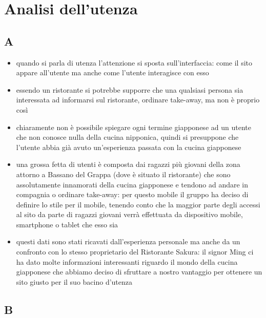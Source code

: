\documentclass[../relazione.tex]{subfiles}
\begin{document}
\section{Analisi dell'utenza}
	\subsection{A}
	\begin{itemize}
		\item quando si parla di utenza l'attenzione si sposta sull'interfaccia: come il sito appare all'utente ma anche come l'utente interagisce con esso
		\item essendo un ristorante si potrebbe supporre che una qualsiasi persona sia interessata ad informarsi sul ristorante, ordinare take-away, ma non è proprio così
		\item chiaramente non è possibile spiegare ogni termine giapponese ad un utente che non conosce nulla della cucina nipponica, quindi si presuppone che l'utente abbia già avuto un'esperienza passata con la cucina giapponese
		\item una grossa fetta di utenti è composta dai ragazzi più giovani della zona attorno a Bassano del Grappa (dove è situato il ristorante) che sono assolutamente innamorati della cucina giapponese e tendono ad andare in compagnia o ordinare take-away: per questo mobile il gruppo ha deciso di definire lo stile per il mobile, tenendo conto che la maggior parte degli accessi al sito da parte di ragazzi giovani verrà effettuata da dispositivo mobile, smartphone o tablet che esso sia
		\item questi dati sono stati ricavati dall'esperienza personale ma anche da un confronto con lo stesso proprietario del Ristorante Sakura: il signor Ming ci ha dato molte informazioni interessanti riguardo il mondo della cucina giapponese che abbiamo deciso di sfruttare a nostro vantaggio per ottenere un sito giusto per il suo bacino d'utenza
	\end{itemize}

	\subsection{B}
\end{document}
